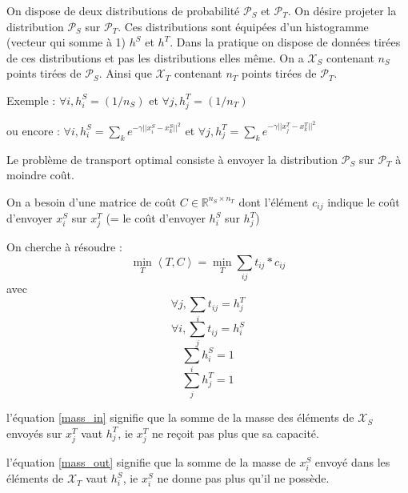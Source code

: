 
\label{day:12-06-2016}



On dispose de deux distributions de probabilité $\mathcal{P}_S$ et $\mathcal{P}_T$.
On désire projeter la distribution $\mathcal{P}_S$ sur $\mathcal{P}_T$.
Ces distributions sont équipées d'un histogramme (vecteur qui somme à 1) $h^S$ et $h^T$.
Dans la pratique on dispose de données tirées de ces distributions et pas les 
distributions elles même. 
On a $\mathcal{X}_S$ contenant $n_S$ points tirées de $\mathcal{P}_S$.
Ainsi que $\mathcal{X}_T$ contenant $n_T$ points tirées de $\mathcal{P}_T$.

Exemple : $\forall i, h^S_i = (1/n_S)$ et $\forall j, h^T_j = (1/n_T)$

ou encore : $\forall i, h^S_i = \sum_k e^{-\gamma ||x_i^S-x_k^S||^2}$ et $\forall j, h^T_j = \sum_k e^{-\gamma ||x_j^T-x_k^T||^2}$

Le problème de transport optimal consiste à envoyer la distribution $\mathcal{P}_S$ 
sur $\mathcal{P}_T$ à moindre coût.

On a besoin d'une matrice de coût $C \in \mathbb{R}^{n_S\times n_T}$ dont 
l'élément $c_{ij}$ indique le coût d'envoyer $x_i^S$ sur $x_j^T$ 
(= le coût d'envoyer $h^S_i$ sur $h^T_j$)

On cherche à résoudre : 
\begin{equation}
\min_T \left<T,C\right> = \min_{T} \sum_{ij} t_{ij}*c_{ij}
\end{equation}
avec
\begin{equation}
\forall j, \sum_i t_{ij} = h^T_j 
\label{mass_in}
\end{equation}
\begin{equation}
\forall i, \sum_j t_{ij} = h^S_i
\label{mass_out}
\end{equation}
\begin{equation}
\sum_i h^S_i = 1
\label{mass_in_tot}
\end{equation}
\begin{equation}
\sum_j h^T_j = 1	
\label{mass_out_tot}
\end{equation}

l'équation \eqref{mass_in} signifie que la somme de la masse des éléments de $\mathcal{X}_S$
envoyés sur $x^T_j$ vaut $h^T_j$, ie $x^T_j$ ne reçoit pas plus que sa capacité.

l'équation \eqref{mass_out} signifie que la somme de la masse de $x^S_i$ envoyé dans les 
éléments de $\mathcal{X}_T$ vaut $h^S_i$, ie $x^S_i$ ne donne pas plus qu'il ne possède.



